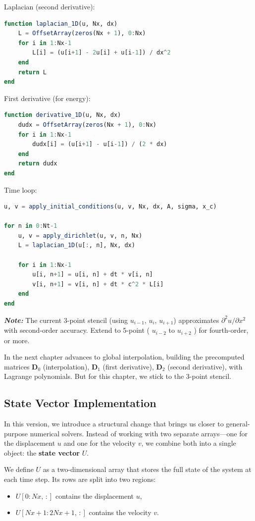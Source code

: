 Laplacian (second derivative):
\begin{lstlisting}[language=Julia]
function laplacian_1D(u, Nx, dx)
    L = OffsetArray(zeros(Nx + 1), 0:Nx)
    for i in 1:Nx-1
        L[i] = (u[i+1] - 2u[i] + u[i-1]) / dx^2
    end
    return L
end
\end{lstlisting}

First derivative (for energy):
\begin{lstlisting}[language=Julia]
function derivative_1D(u, Nx, dx)
    dudx = OffsetArray(zeros(Nx + 1), 0:Nx)
    for i in 1:Nx-1
        dudx[i] = (u[i+1] - u[i-1]) / (2 * dx)
    end
    return dudx
end
\end{lstlisting}

Time loop:
\begin{lstlisting}[language=Julia]
u, v = apply_initial_conditions(u, v, Nx, dx, A, sigma, x_c)

for n in 0:Nt-1
    u, v = apply_dirichlet(u, v, n, Nx)
    L = laplacian_1D(u[:, n], Nx, dx)

    for i in 1:Nx-1
        u[i, n+1] = u[i, n] + dt * v[i, n]
        v[i, n+1] = v[i, n] + dt * c^2 * L[i]
    end
end
\end{lstlisting}

\emph{\textbf{Note:}} The current 3-point stencil (using $u_{i-1}$, $u_i$, $u_{i+1}$) approximates $\partial^2 u / \partial x^2$ with second-order accuracy. Extend to 5-point ( $u_{i-2}$ to $u_{i+2}$ ) for fourth-order, or more. 

In the next chapter advances to global interpolation, building the precomputed matrices $\mathbf{D}_0$ (interpolation), $\mathbf{D}_1$ (first derivative), $\mathbf{D}_2$ (second derivative), with Lagrange polynomials. But for this chapter, we stick to the 3-point stencil.

\newpage

\subsection{State Vector Implementation}

In this version, we introduce a structural change that brings us closer to general-purpose numerical solvers. Instead of working with two separate arrays—one for the displacement $u$ and one for the velocity $v$, we combine both into a single object: the \textbf{state vector} $U$.

\vspace{0.5em}
\noindent
We define $U$ as a two-dimensional array that stores the full state of the system at each time step. Its rows are split into two regions:
\begin{itemize}
  \item $U[0:Nx, \, :]$ contains the displacement $u$,
  \item $U[Nx+1:2Nx+1, \, :]$ contains the velocity $v$.
\end{itemize}

